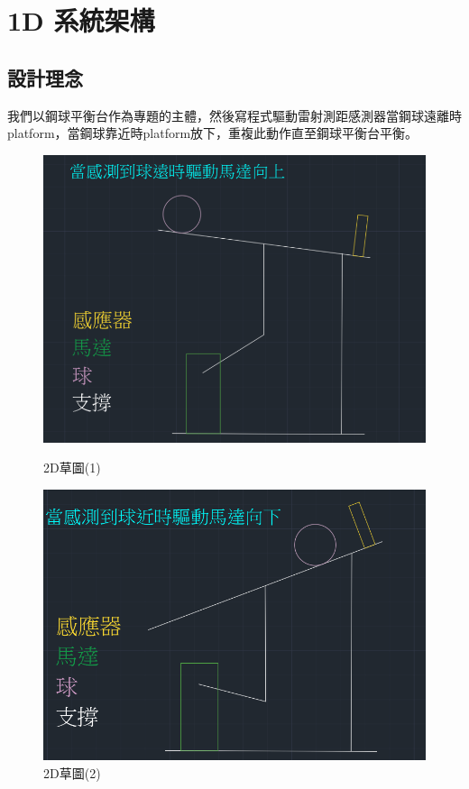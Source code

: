 \section*{1D 系統架構}

\subsection*{設計理念}

我們以鋼球平衡台作為專題的主體，然後寫程式驅動雷射測距感測器當鋼球遠離時platform，當鋼球靠近時platform放下，重複此動作直至鋼球平衡台平衡。

\begin{figure}[h!]
    \centering
    \begin{minipage}[b]{0.45\textwidth}
        \centering
        \includegraphics[width=\textwidth,height=0.2\textheight]{./../images/螢幕擷取畫面 2024-05-22 181158.png}
        \caption{2D草圖(1)}
    \end{minipage}
    \hfill
    \begin{minipage}[b]{0.45\textwidth}
        \centering
        \includegraphics[width=\textwidth,height=0.2\textheight]{./../images/螢幕擷取畫面 2024-05-22 180925.png} 
        \caption{2D草圖(2)}
    \end{minipage}
\end{figure}


